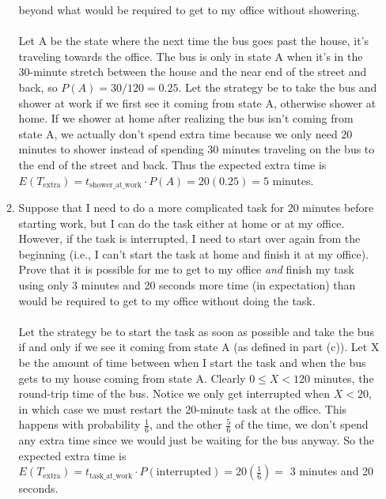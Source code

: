 \documentclass[11pt,fleqn]{article}
\begin{document}
\begin{enumerate}
\begin{enumerate}
beyond what would be required to get to my office without showering. \\\\
Let A be the state where the next time the bus goes past the house, it's traveling towards the office. The bus is only in state A when it's in the 30-minute stretch between the house and the near end of the street and back, so $P(A) = 30/120 = 0.25$. Let the strategy be to take the bus and shower at work if we first see it coming from state A, otherwise shower at home. If we shower at home after realizing the bus isn't coming from state A, we actually don't spend extra time because we only need 20 minutes to shower instead of spending 30 minutes traveling on the bus to the end of the street and back. Thus the expected extra time is $E(T_{\text{extra}}) = t_{\text{shower\_at\_work}} \cdot P(A) = 20(0.25) = 5$ minutes. \\
\newpage
\item
Suppose that I need to do a more complicated task for 20 minutes
before starting work, but I can do the task either at home or at my office.
However, if the task is interrupted,
I need to start over again from the beginning
(i.e., I can't start the task at home and finish it at my office).
Prove that it is possible for me to get to my office \emph{and}
finish my task using only 3 minutes and 20 seconds more time (in expectation)
than would be required to get to my office without doing the task. \\\\
Let the strategy be to start the task as soon as possible and take the bus if and only if we see it coming from state A (as defined in part (c)). Let X be the amount of time between when I start the task and when the bus gets to my house coming from state A. Clearly $0 \leq X < 120$ minutes, the round-trip time of the bus. Notice we only get interrupted when $X<20$, in which case we must restart the 20-minute task at the office. This happens with probability $\frac16$, and the other $\frac56$ of the time, we don't spend any extra time since we would just be waiting for the bus anyway. So the expected extra time is $E(T_{\text{extra}}) = t_{\text{task\_at\_work}} \cdot P(\text{interrupted}) = 20(\frac16) =$ 3 minutes and 20 seconds.
\end{enumerate}


\end{enumerate}
\end{document}
